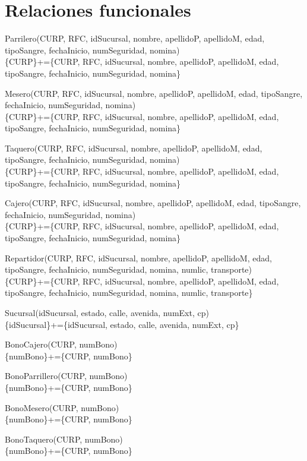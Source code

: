 \documentclass[a4paper, 12pt]{report}
\begin{document}
\section*{Relaciones funcionales}
Parrilero(CURP, RFC, idSucursal, nombre, apellidoP, apellidoM, edad,
    tipoSangre, fechaInicio, numSeguridad, nomina)\\
    \{CURP\}+=\{CURP, RFC, idSucursal, nombre, apellidoP, apellidoM, edad,
        tipoSangre, fechaInicio, numSeguridad, nomina\}

Mesero(CURP, RFC, idSucursal, nombre, apellidoP, apellidoM, edad,
    tipoSangre, fechaInicio, numSeguridad, nomina)\\
    \{CURP\}+=\{CURP, RFC, idSucursal, nombre, apellidoP, apellidoM, edad,
        tipoSangre, fechaInicio, numSeguridad, nomina\}

Taquero(CURP, RFC, idSucursal, nombre, apellidoP, apellidoM, edad,
    tipoSangre, fechaInicio, numSeguridad, nomina)\\
    \{CURP\}+=\{CURP, RFC, idSucursal, nombre, apellidoP, apellidoM, edad,
        tipoSangre, fechaInicio, numSeguridad, nomina\}

Cajero(CURP, RFC, idSucursal, nombre, apellidoP, apellidoM, edad,
    tipoSangre, fechaInicio, numSeguridad, nomina)\\
    \{CURP\}+=\{CURP, RFC, idSucursal, nombre, apellidoP, apellidoM, edad,
        tipoSangre, fechaInicio, numSeguridad, nomina\}

Repartidor(CURP, RFC, idSucursal, nombre, apellidoP, apellidoM, edad,
    tipoSangre, fechaInicio, numSeguridad, nomina, numlic, transporte)\\
    \{CURP\}+=\{CURP, RFC, idSucursal, nombre, apellidoP, apellidoM, edad,
        tipoSangre, fechaInicio, numSeguridad, nomina, numlic, transporte\}

Sucursal(idSucursal, estado, calle, avenida, numExt, cp)\\
\{idSucursal\}+=\{idSucursal, estado, calle, avenida, numExt, cp\}

BonoCajero(CURP, numBono)\\
\{numBono\}+=\{CURP, numBono\}

BonoParrillero(CURP, numBono)\\
\{numBono\}+=\{CURP, numBono\}

BonoMesero(CURP, numBono)\\
\{numBono\}+=\{CURP, numBono\}

BonoTaquero(CURP, numBono)\\
\{numBono\}+=\{CURP, numBono\}
\end{document}

